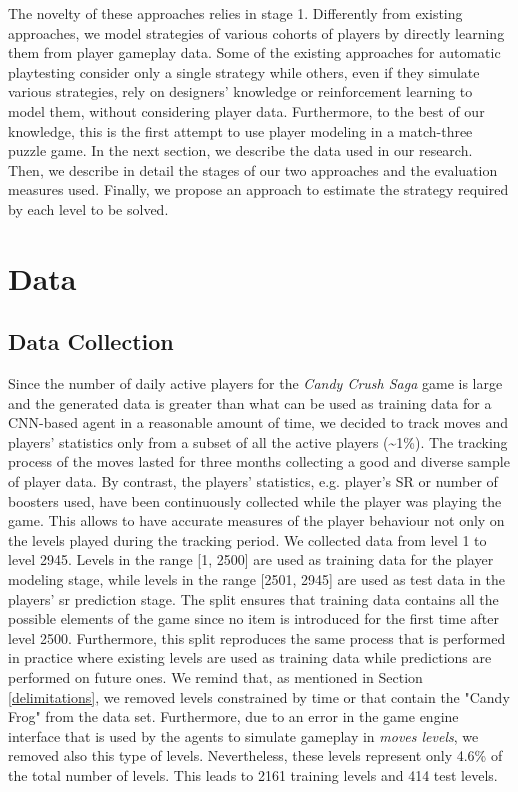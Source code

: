  The novelty of these approaches relies in stage 1. Differently from existing approaches, we model strategies of various cohorts of players by directly learning them from player gameplay data. Some of the existing approaches for automatic playtesting consider only a single strategy while others, even if they simulate various strategies, rely on designers' knowledge or reinforcement learning to model them, without considering player data. Furthermore, to the best of our knowledge, this is the first attempt to use player modeling in a match-three puzzle game. In the next section, we describe the data used in our research. Then, we describe in detail the stages of our two approaches and the evaluation measures used. Finally, we propose an approach to estimate the strategy required by each level to be solved. 
 
\section{Data}
\subsection{Data Collection}
Since the number of daily active players for the \textit{Candy Crush Saga} game is large and the generated data is greater than what can be used as training data for a \acs{CNN}-based agent in a reasonable amount of time, we decided to track moves and players' statistics only from a subset of all the active players (\textasciitilde1\%). The tracking process of the moves lasted for three months collecting a good and diverse sample of player data. By contrast, the players' statistics, e.g. player's SR or number of boosters used, have been continuously collected while the player was playing the game. This allows to have accurate measures of the player behaviour not only on the levels played during the tracking period.
We collected data from level 1 to level 2945. Levels in the range [1, 2500] are used as training data for the player modeling stage, while levels in the range [2501, 2945] are used as test data in the players' \acs{sr} prediction stage. The split ensures that training data contains all the possible elements of the game since no item is introduced for the first time after level 2500. Furthermore, this split reproduces the same process that is performed in practice where existing levels are used as training data while predictions are performed on future ones. We remind that, as mentioned in Section \ref{delimitations}, we removed levels constrained by time or that contain the "Candy Frog" from the data set. Furthermore, due to an error in the game engine interface that is used by the agents to simulate gameplay in \textit{moves levels}, we removed also this type of levels. Nevertheless, these levels represent only 4.6\% of the total number of levels. This leads to 2161 training levels and 414 test levels.

